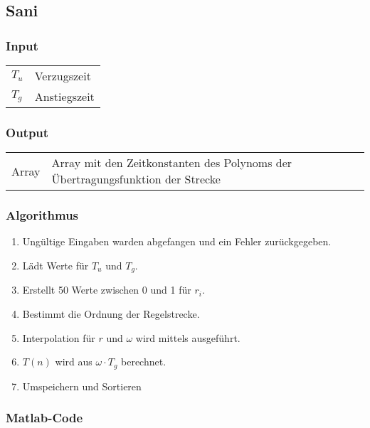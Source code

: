 \subsection{Sani}
\label{app:sani}

\subsubsection*{Input}

\begin{tabular}{p{40mm}l}
    $ T_u $ & Verzugszeit \\
    $ T_g $ & Anstiegszeit
\end{tabular}

\subsubsection*{Output}
\begin{tabular}{p{40mm}l}
    Array & \parbox[t][4em][s]{0.7\textwidth}{Array mit den Zeitkonstanten des Polynoms der \"Ubertragungsfunktion der Strecke}
\end{tabular}

\subsubsection*{Algorithmus}
\begin{enumerate}
    \item
        Ung\"ultige Eingaben warden abgefangen und ein Fehler zur\"uckgegeben.
    \item
        L\"adt Werte f\"ur $T_u$ und $T_g$.
    \item
        Erstellt 50 Werte zwischen 0 und 1 f\"ur $r_i$.
    \item
        Bestimmt die Ordnung der Regelstrecke.
    \item
        Interpolation  f\"ur $r$  und  $\omega$  wird mittels  
        ausgef\"uhrt.
    \item
        $T(n)$ wird aus $\omega \cdot T_g$ berechnet.
    \item
        Umspeichern und Sortieren
\end{enumerate}

\subsubsection*{Matlab-Code}



